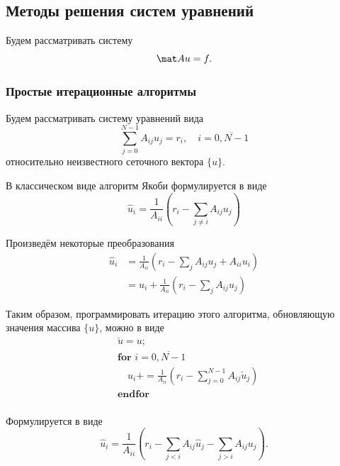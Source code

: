 \subsection{Методы решения систем уравнений}
Будем рассматривать систему 
\begin{equation}
\label{eq:sae_generic}
\mat A u = f.
\end{equation}

\subsubsection{Простые итерационные алгоритмы}
\label{sec:sae_simple}
\label{sec:sae_jacobi}
Будем рассматривать систему уравнений вида
\begin{equation*}
    \sum_{j=0}^{N-1} A_{ij} u_j = r_i, \quad i = \overline{0, N-1}
\end{equation*}
относительно неизвестного сеточного вектора $\{u\}$.

В классическом виде алгоритм Якоби формулируется в виде
\begin{equation*}
    \hat u_i = \frac{1}{A_{ii}}\left(r_i - \sum_{j\neq i} A_{ij}{u_j}\right)
\end{equation*}

Произведём некоторые преобразования
\begin{align*}
    \hat u_i &= \frac{1}{A_{ii}}\left(r_i - \sum_{j} A_{ij}{u_j} + A_{ii}u_i\right) \\
             &= u_i + \frac{1}{A_{ii}}\left(r_i - \sum_{j} A_{ij}{u_j}\right)
\end{align*}

Таким образом, программировать итерацию этого алгоритма, обновляющую значения массива $\{u\}$, можно в виде
\begin{align*}
    &\check u = u; \\
    &\textbf{for } i=\overline{0, N-1} \\ 
    &\quad u_i \mathrel{{+}{=}} \frac{1}{A_{ii}}\left(r_i - \sum_{j=0}^{N-1} A_{ij}{\check u_j}\right)\\
    &\textbf{endfor} \\
\end{align*}

\label{sec:sae_seidel}

Формулируется в виде
\begin{equation*}
    \hat u_i = \frac{1}{A_{ii}}\left(r_i - \sum_{j<i} A_{ij}{\hat u_j} - \sum_{j>i} A_{ij}{u_j} \right).
\end{equation*}

